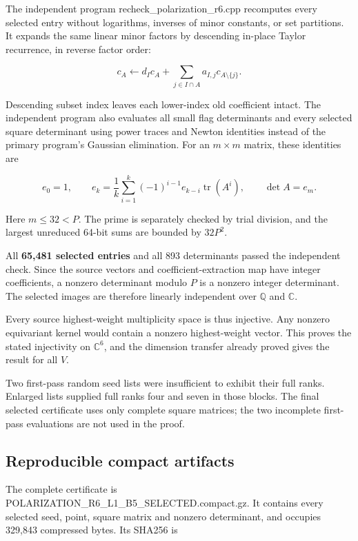 \documentclass[
  10pt,
]{article}
\begin{document}
The independent program recheck\_polarization\_r6.cpp recomputes every
selected entry without logarithms, inverses of minor constants, or set
partitions. It expands the same linear minor factors by descending
in-place Taylor recurrence, in reverse factor order:

\[
 c_A\leftarrow d_Ic_A+
          \sum_{j\in I\cap A}a_{I,j}c_{A\setminus\{j\}}.
\]

Descending subset index leaves each lower-index old coefficient intact.
The independent program also evaluates all small flag determinants and
every selected square determinant using power traces and Newton
identities instead of the primary program's Gaussian elimination. For an
\(m\times m\) matrix, these identities are

\[
 e_0=1,\qquad
 e_k=\frac1k\sum_{i=1}^k(-1)^{i-1}e_{k-i}\operatorname{tr}(A^i),
 \qquad\det A=e_m.
\]

Here \(m\le32<P\). The prime is separately checked by trial division,
and the largest unreduced 64-bit sums are bounded by \(32P^2\).

All \textbf{65,481 selected entries} and all 893 determinants passed the
independent check. Since the source vectors and coefficient-extraction
map have integer coefficients, a nonzero determinant modulo \(P\) is a
nonzero integer determinant. The selected images are therefore linearly
independent over \(\mathbb Q\) and \(\mathbb C\).

Every source highest-weight multiplicity space is thus injective. Any
nonzero equivariant kernel would contain a nonzero highest-weight
vector. This proves the stated injectivity on \(\mathbb C^6\), and the
dimension transfer already proved gives the result for all \(V\).

Two first-pass random seed lists were insufficient to exhibit their full
ranks. Enlarged lists supplied full ranks four and seven in those
blocks. The final selected certificate uses only complete square
matrices; the two incomplete first-pass evaluations are not used in the
proof.

\subsection{Reproducible compact
artifacts}\label{reproducible-compact-artifacts}

The complete certificate is
POLARIZATION\_R6\_L1\_B5\_SELECTED.compact.gz. It contains every
selected seed, point, square matrix and nonzero determinant, and
occupies 329,843 compressed bytes. Its SHA256 is
\end{document}
